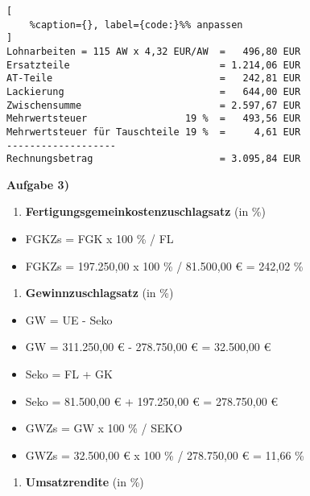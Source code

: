 \lstset{language=Python}%
\begin{lstlisting}[
	%caption={}, label={code:}%% anpassen
]
Lohnarbeiten = 115 AW x 4,32 EUR/AW  =   496,80 EUR
Ersatzteile                          = 1.214,06 EUR
AT-Teile                             =   242,81 EUR
Lackierung                           =   644,00 EUR
Zwischensumme                        = 2.597,67 EUR
Mehrwertsteuer                 19 %  =   493,56 EUR
Mehrwertsteuer für Tauschteile 19 %  =     4,61 EUR
-------------------
Rechnungsbetrag                      = 3.095,84 EUR
\end{lstlisting}

\textbf{Aufgabe 3)}

\begin{enumerate}
\def\labelenumi{\alph{enumi})}
\item
  \textbf{Fertigungsgemeinkostenzuschlagsatz} (in \%)
\end{enumerate}

\begin{itemize}
\item
  FGKZs = FGK x 100 \% / FL
\item
  FGKZs = 197.250,00 x 100 \% / 81.500,00 € = 242,02 \%
\end{itemize}

\begin{enumerate}
\def\labelenumi{\alph{enumi})}
\setcounter{enumi}{1}
\item
  \textbf{Gewinnzuschlagsatz} (in \%)
\end{enumerate}

\begin{itemize}
\item
  GW = UE - Seko
\item
  GW = 311.250,00 € - 278.750,00 € = 32.500,00 €
\item
  Seko = FL + GK
\item
  Seko = 81.500,00 € + 197.250,00 € = 278.750,00 €
\item
  GWZs = GW x 100 \% / SEKO
\item
  GWZs = 32.500,00 € x 100 \% / 278.750,00 € = 11,66 \%
\end{itemize}

\begin{enumerate}
\def\labelenumi{\alph{enumi})}
\setcounter{enumi}{2}
\item
  \textbf{Umsatzrendite} (in \%)\\
\end{enumerate}

